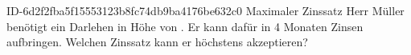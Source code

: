\begin{exercise}
      {ID-6d2f2fba5f15553123b8fc74db9ba4176be632c0}
      {Maximaler Zinssatz}
  \ifproblem\problem
    Herr Müller benötigt ein Darlehen in Höhe von . Er kann dafür
    in \num{4} Monaten  Zinsen aufbringen. Welchen Zinssatz kann
    er höchstens akzeptieren?
  \fi
\end{exercise}
